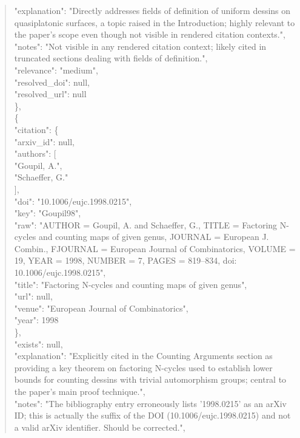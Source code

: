 \documentclass[11pt]{article}
\begin{document}
\begin{quote}
      "explanation": "Directly addresses fields of definition of uniform dessins on quasiplatonic surfaces, a topic raised in the Introduction; highly relevant to the paper's scope even though not visible in rendered citation contexts.",\\
      "notes": "Not visible in any rendered citation context; likely cited in truncated sections dealing with fields of definition.",\\
      "relevance": "medium",\\
      "resolved\_doi": null,\\
      "resolved\_url": null\\
    \},\\
    \{\\
      "citation": \{\\
        "arxiv\_id": null,\\
        "authors": [\\
          "Goupil, A.",\\
          "Schaeffer, G."\\
        ],\\
        "doi": "10.1006/eujc.1998.0215",\\
        "key": "Goupil98",\\
        "raw": "AUTHOR = Goupil, A. and Schaeffer, G., TITLE = Factoring N-cycles and counting maps of given genus, JOURNAL = European J. Combin., FJOURNAL = European Journal of Combinatorics, VOLUME = 19, YEAR = 1998, NUMBER = 7, PAGES = 819--834, doi: 10.1006/eujc.1998.0215",\\
        "title": "Factoring N-cycles and counting maps of given genus",\\
        "url": null,\\
        "venue": "European Journal of Combinatorics",\\
        "year": 1998\\
      \},\\
      "exists": null,\\
      "explanation": "Explicitly cited in the Counting Arguments section as providing a key theorem on factoring N-cycles used to establish lower bounds for counting dessins with trivial automorphism groups; central to the paper's main proof technique.",\\
      "notes": "The bibliography entry erroneously lists '1998.0215' as an arXiv ID; this is actually the suffix of the DOI (10.1006/eujc.1998.0215) and not a valid arXiv identifier. Should be corrected.",\\

\end{quote}
\end{document}
